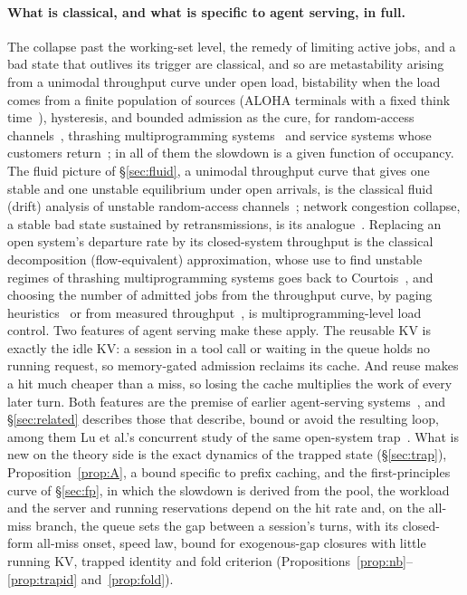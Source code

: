 \paragraph{What is classical, and what is specific to agent serving, in full.}\label{app:classical} The collapse past the working-set level, the remedy of limiting active jobs, and a bad state that outlives its trigger are classical, and so are metastability arising from a unimodal throughput curve under open load, bistability when the load comes from a finite population of sources (ALOHA terminals with a fixed think time~\citep{carleial1975bistable}), hysteresis, and bounded admission as the cure, for random-access channels~\citep{kleinrock1975aloha,carleial1975bistable}, thrashing multiprogramming systems~\citep{courtois1975decomposability,wilkes1973dynamics,nelson1987stochastic,yokohira1989catastrophic} and service systems whose customers return~\citep{chan2014speedup,dong2015slowdowns,ingolfsson2020fluid}; in all of them the slowdown is a given function of occupancy. The fluid picture of \S\ref{sec:fluid}, a unimodal throughput curve that gives one stable and one unstable equilibrium under open arrivals, is the classical fluid (drift) analysis of unstable random-access channels~\citep{kleinrock1975aloha,fayolle1977stability}; network congestion collapse, a stable bad state sustained by retransmissions, is its analogue~\citep{nagle1984congestion,jacobson1988congestion}. Replacing an open system's departure rate by its closed-system throughput is the classical decomposition (flow-equivalent) approximation, whose use to find unstable regimes of thrashing multiprogramming systems goes back to Courtois~\citep{courtois1975decomposability}, and choosing the number of admitted jobs from the throughput curve, by paging heuristics~\citep{denning1976optimal} or from measured throughput~\citep{heiss1991adaptive,schroeder2006mpl}, is multiprogramming-level load control. Two features of agent serving make these apply. The reusable KV is exactly the idle KV: a session in a tool call or waiting in the queue holds no running request, so memory-gated admission reclaims its cache. And reuse makes a hit much cheaper than a miss, so losing the cache multiplies the work of every later turn. Both features are the premise of earlier agent-serving systems~\citep{li2025continuum,abhyankar2024infercept,xia2026mori,bian2025tokencake,biswas2026sutradhara}, and \S\ref{sec:related} describes those that describe, bound or avoid the resulting loop, among them Lu et al.'s concurrent study of the same open-system trap~\citep{lu2026cachetrap}. What is new on the theory side is the exact dynamics of the trapped state (\S\ref{sec:trap}), Proposition~\ref{prop:A}, a bound specific to prefix caching, and the first-principles curve of \S\ref{sec:fp}, in which the slowdown is derived from the pool, the workload and the server and running reservations depend on the hit rate and, on the all-miss branch, the queue sets the gap between a session's turns, with its closed-form all-miss onset, speed law, bound for exogenous-gap closures with little running KV, trapped identity and fold criterion (Propositions~\ref{prop:nb}--\ref{prop:trapid} and~\ref{prop:fold}).


